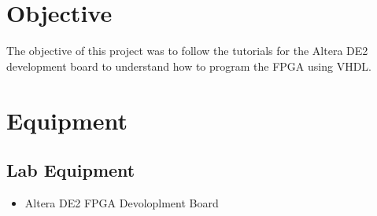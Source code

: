 \documentclass{scrreprt}
\newcommand{\component}[2]{(#1) #2}
\begin{document}
\section{Objective}
   The objective of this project was to follow the tutorials for the Altera DE2 development board to understand how to program the FPGA using VHDL.

\section{Equipment}
    
    
    \subsection{Lab Equipment}
        \begin{itemize}
            \item Altera DE2 FPGA Devoloplment Board
        \end{itemize}
\end{document}
